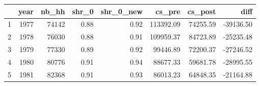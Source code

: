 \begin{table}[ht]
\centering
\begin{tabular}{rrrrrrrr}
  \hline
 & year & nb\_hh & shr\_0 & shr\_0\_new & cs\_pre & cs\_post & diff \\ 
  \hline
1 & 1977 & 74142 & 0.88 & 0.92 & 113392.09 & 74255.59 & -39136.50 \\ 
  2 & 1978 & 76030 & 0.88 & 0.91 & 109959.37 & 84723.89 & -25235.48 \\ 
  3 & 1979 & 77330 & 0.89 & 0.92 & 99446.89 & 72200.37 & -27246.52 \\ 
  4 & 1980 & 80776 & 0.91 & 0.94 & 88677.33 & 59681.78 & -28995.55 \\ 
  5 & 1981 & 82368 & 0.91 & 0.93 & 86013.23 & 64848.35 & -21164.88 \\ 
   \hline
\end{tabular}
\end{table}
